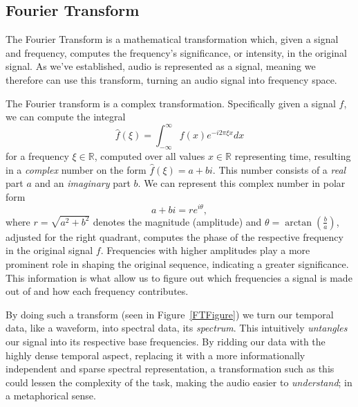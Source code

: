 \subsection{Fourier Transform}

The Fourier Transform is a mathematical transformation which, given a signal and frequency, computes the frequency's significance, or intensity, in the original signal. As we've established, audio is represented as a signal, meaning we therefore can use this transform, turning an audio signal into frequency space. 

The Fourier transform is a complex transformation. Specifically given a signal $f$, we can compute the integral \[ \widehat{f}(\xi) = \int^{\infty}_{-\infty}{f(x)e^{-i2\pi \xi x} dx} \] for a frequency $\xi \in \mathbb{R}$, computed over all values $x \in \mathbb{R}$ representing time, resulting in a \textit{complex} number on the form $\widehat{f}(\xi) = a + bi$. This number consists of a \textit{real} part $a$ and an \textit{imaginary} part $b$. We can represent this complex number in polar form \[ a + bi = re^{i\theta}, \] where $r = \sqrt{a^2 + b^2}$ denotes the magnitude (amplitude) and $\theta = \arctan{(\frac{b}{a})}$, adjusted for the right quadrant, computes the phase of the respective frequency in the original signal $f$. Frequencies with higher amplitudes play a more prominent role in shaping the original sequence, indicating a greater significance. This information is what allow us to figure out which frequencies a signal is made out of and how each frequency contributes. 

By doing such a transform (seen in Figure~\ref{FTFigure}) we turn our temporal data, like a waveform, into spectral data, its \textit{spectrum}. This intuitively \textit{untangles} our signal into its respective base frequencies. By ridding our data with the highly dense temporal aspect, replacing it with a more informationally independent and sparse spectral representation, a transformation such as this could lessen the complexity of the task, making the audio easier to \textit{understand}; in a metaphorical sense.

